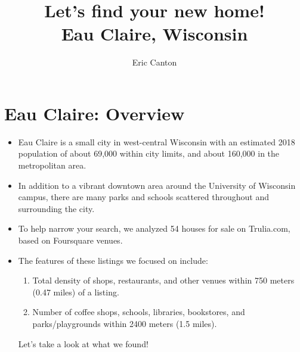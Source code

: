 \documentclass{beamer}
\title{Let's find your new home!\\ Eau Claire, Wisconsin}
\author{Eric Canton}
\date{}
\begin{document}
\begin{frame}
    \maketitle
\end{frame}

\section{Eau Claire: Overview}
\begin{frame}
    \begin{itemize}
        \item Eau Claire is a small city in west-central Wisconsin with an estimated 2018 population of about 69,000 within city limits, and about 160,000 in the metropolitan area.\pause
    
        \item In addition to a vibrant downtown area around the University of Wisconsin campus, there are many parks and schools scattered throughout and surrounding the city. 

    \pause
        \item To help narrow your search, we analyzed 54 houses for sale on Trulia.com, based on Foursquare venues.\pause
            
        \item 
            The features of these listings we focused on include:
            \begin{enumerate}
                \item Total density of shops, restaurants, and other venues within 750 meters (0.47 miles) of a listing. \pause
                \item Number of coffee shops, schools, libraries, bookstores, and parks/playgrounds within 2400 meters (1.5 miles).
            \end{enumerate}
            Let's take a look at what we found!
    \end{itemize}
\end{frame}
\end{document}
